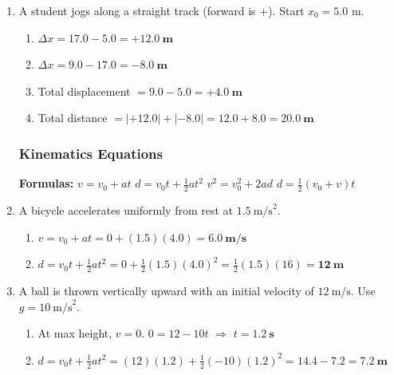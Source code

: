 \documentclass[12pt, twoside]{article}
\begin{document}
\begin{enumerate}[itemsep=0.25cm]
\item A student jogs along a straight track (forward is $+$). Start $x_0 = 5.0$ m.
  \begin{enumerate}[itemsep=0.5cm]
    \item $\Delta x = 17.0 - 5.0 = \mathbf{+12.0~\textbf{m}}$
    \item $\Delta x = 9.0 - 17.0 = \mathbf{-8.0~\textbf{m}}$
    \item Total displacement $= 9.0 - 5.0 = \mathbf{+4.0~\textbf{m}}$
    \item Total distance $= |{+12.0}| + |{-8.0}| = 12.0 + 8.0 = \mathbf{20.0~\textbf{m}}$
  \end{enumerate}

\newpage
\subsubsection*{Kinematics Equations}

\textbf{Formulas:} \quad $v = v_0 + at$ \quad\quad $d = v_0 t + \frac{1}{2}at^2$ \quad\quad $v^2 = v_0^2 + 2ad$ \quad\quad $d = \frac{1}{2}(v_0 + v)t$

\vspace{0.5cm}

\item A bicycle accelerates uniformly from rest at $1.5~\text{m/s}^2$.
  \begin{enumerate}[itemsep=0.75cm]
    \item $v = v_0 + at = 0 + (1.5)(4.0) = \mathbf{6.0~\textbf{m/s}}$
    \item $d = v_0 t + \frac{1}{2}at^2 = 0 + \frac{1}{2}(1.5)(4.0)^2 = \frac{1}{2}(1.5)(16) = \mathbf{12~\textbf{m}}$
  \end{enumerate}
  \vspace{0.5cm}

\item A ball is thrown vertically upward with an initial velocity of $12~\text{m/s}$. Use $g = 10~\text{m/s}^2$.
  \begin{enumerate}[itemsep=0.75cm]
    \item At max height, $v = 0$. \quad $0 = 12 - 10t$ \quad $\Rightarrow$ \quad $t = \mathbf{1.2~\textbf{s}}$
    \item $d = v_0 t + \frac{1}{2}at^2 = (12)(1.2) + \frac{1}{2}(-10)(1.2)^2 = 14.4 - 7.2 = \mathbf{7.2~\textbf{m}}$
  \end{enumerate}

\vspace{0.5cm}


\end{enumerate}
\end{document}
